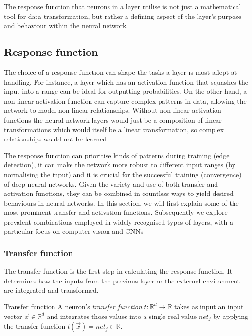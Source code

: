 The response function that neurons in a layer utilise is not just a mathematical tool for data transformation, but rather a defining aspect of the layer's purpose and behaviour within the neural network. 

\subsection{Response function}

The choice of a response function can shape the tasks a layer is most adept at handling. For instance, a layer which has an activation function that squashes the input into a range can be ideal for outputting probabilities. On the other hand, a non-linear activation function can capture complex patterns in data, allowing the network to model non-linear relationships. Without non-linear activation functions the neural network layers would just be a composition of linear transformations which would itself be a linear transformation, so complex relationships would not be learned. 

The response function can prioritise kinds of patterns during training (\eg edge detection), it can make the network more robust to different input ranges (\eg by normalising the input) and it is crucial for the successful training (\ie convergence) of deep neural networks. Given the variety and use of both transfer and activation functions, they can be combined in countless ways to yield desired behaviours in neural networks. In this section, we will first explain some of the most prominent transfer and activation functions. Subsequently we explore prevalent combinations employed in widely recognised types of layers, with a particular focus on computer vision and CNNs.

\subsubsection{Transfer function}
\label{section:trans}
The transfer function is the first step in calculating the response function. It determines how the inputs from the previous layer or the external environment are integrated and transformed. 

\begin{Definition}{Transfer function}{}
A neuron's \emph{transfer function} $t:\mathbb{R}^d \to \mathbb{R}$ takes as input an input vector $\vec{x}\in \mathbb{R}^d$ and integrates those values into a single real value $net_j$ by applying the transfer function $t(\vec{x})=net_j\in \mathbb{R}$.
\end{Definition}


